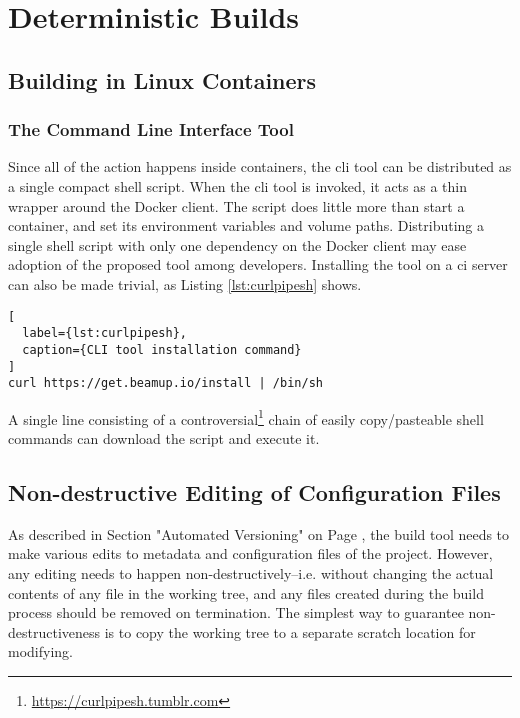 \section{Deterministic Builds}

\subsection{Building in Linux Containers}

\subsubsection{The Command Line Interface Tool}
Since all of the action happens inside containers, the \acrshort{cli} tool can be distributed as a single compact shell script. When the \acrshort{cli} tool is invoked, it acts as a thin wrapper around the Docker client. The script does little more than start a container, and set its environment variables and volume paths. Distributing a single shell script with only one dependency on the Docker client may ease adoption of the proposed tool among developers. Installing the tool on a \acrshort{ci} server can also be made trivial, as Listing \ref{lst:curlpipesh} shows.

\begin{lstlisting}[
  label={lst:curlpipesh},
  caption={CLI tool installation command}
]
curl https://get.beamup.io/install | /bin/sh
\end{lstlisting}

A single line consisting of a controversial\footnote{\url{https://curlpipesh.tumblr.com}} chain of easily copy/pasteable shell commands can download the script and execute it.


\subsection{Non-destructive Editing of Configuration Files}

As described in Section "Automated Versioning" on Page \pageref{tempeditaftercommit}, the build tool needs to make various edits to metadata and configuration files of the project. However, any editing needs to happen non-destructively--i.e. without changing the actual contents of any file in the working tree, and any files created during the build process should be removed on termination. The simplest way to guarantee non-destructiveness is to copy the working tree to a separate scratch location for modifying.

